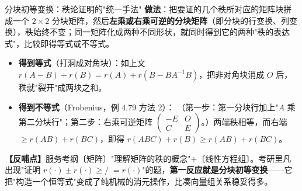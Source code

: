 \begin{fdeep}{分块初等变换：秩论证明的"统一手法"}
\textbf{做法}：把要证的几个秩所对应的矩阵块拼成一个 $2\times2$ 分块矩阵，然后\textbf{左乘或右乘可逆的分块矩阵}（即分块的行变换、列变换），秩始终不变；同一矩阵化成两种不同形状，就同时得到它的两种"秩的表达式"，比较即得等式或不等式。
\begin{itemize}[leftmargin=2.2em,itemsep=0.22em]
\item \textbf{得到等式}（打洞成对角块）：如上文 $r(A-B)+r(B)=r(A)+r(B-BA^{-1}B)$，把非对角块消成 $O$ 后，秩就"裂开"成两块之和。
\item \textbf{得到不等式}（Frobenius，例 4.79 方法 2）：
（第一步：第一分块行加上"$A$ 乘第二分块行"；第二步：右乘可逆矩阵 $\begin{pmatrix}-E&O\\ C&E\end{pmatrix}$。）两端秩相等，而右端 $\ge r(AB)+r(BC)$，即得 $r(ABC)+r(B)\ge r(AB)+r(BC)$。
\end{itemize}
\textbf{【反哺点】}服务考纲〔矩阵〕"理解矩阵的秩的概念"+〔线性方程组〕。考研里凡出现"证明 $r(\cdot)\pm r(\cdot)\ge/\;=r(\cdot)$"的题，\textbf{第一反应就是分块初等变换}——它把"构造一个恒等式"变成了纯机械的消元操作，比凑向量组关系稳妥得多。
\end{fdeep}


